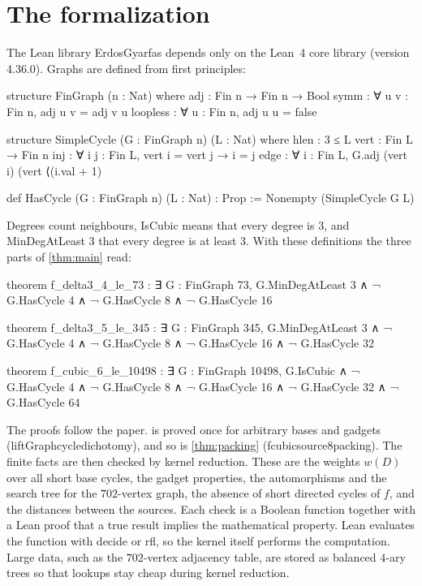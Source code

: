 \documentclass[11pt]{amsart}
\theoremstyle{definition}
\theoremstyle{remark}
\newcommand{\leanus}{\textunderscore\allowbreak}
\newcommand{\lean}[1]{{\ttfamily\let\_\leanus #1}}
\begin{document}
\section{The formalization}\label{sec:formal}

The Lean library \lean{ErdosGyarfas} depends only on the Lean~4 core library
(version 4.36.0). Graphs are defined from first principles:

\begin{leancode}
structure FinGraph (n : Nat) where
  adj : Fin n → Fin n → Bool
  symm : ∀ u v : Fin n, adj u v = adj v u
  loopless : ∀ u : Fin n, adj u u = false

structure SimpleCycle (G : FinGraph n) (L : Nat) where
  hlen : 3 ≤ L
  vert : Fin L → Fin n
  inj : ∀ i j : Fin L, vert i = vert j → i = j
  edge : ∀ i : Fin L,
    G.adj (vert i) (vert ⟨(i.val + 1) %

def HasCycle (G : FinGraph n) (L : Nat) : Prop := Nonempty (SimpleCycle G L)
\end{leancode}

Degrees count neighbours, \lean{IsCubic} means that every degree is $3$, and
\lean{MinDegAtLeast 3} that every degree is at least $3$. With these
definitions the three parts of \cref{thm:main} read:

\begin{leancode}
theorem f_delta3_4_le_73 : ∃ G : FinGraph 73,
    G.MinDegAtLeast 3 ∧ ¬ G.HasCycle 4 ∧ ¬ G.HasCycle 8 ∧ ¬ G.HasCycle 16
\end{leancode}
\begin{leancode}
theorem f_delta3_5_le_345 : ∃ G : FinGraph 345,
    G.MinDegAtLeast 3 ∧ ¬ G.HasCycle 4 ∧ ¬ G.HasCycle 8 ∧
    ¬ G.HasCycle 16 ∧ ¬ G.HasCycle 32
\end{leancode}
\begin{leancode}
theorem f_cubic_6_le_10498 : ∃ G : FinGraph 10498,
    G.IsCubic ∧ ¬ G.HasCycle 4 ∧ ¬ G.HasCycle 8 ∧
    ¬ G.HasCycle 16 ∧ ¬ G.HasCycle 32 ∧ ¬ G.HasCycle 64
\end{leancode}

The proofs follow the paper.  is proved once for arbitrary
bases and gadgets (\lean{liftGraph\_cycle\_dichotomy}), and so is
\cref{thm:packing} (\lean{f\_cubic\_6\_source\_8packing}). The finite facts are
then checked by kernel reduction. These are the weights $w(D)$ over all short
base cycles, the gadget properties, the automorphisms and the search tree for
the $702$-vertex graph, the absence of short directed cycles of $f$, and the
distances between the sources. Each check is a Boolean function together with
a Lean proof that a \lean{true} result implies the mathematical property. Lean
evaluates the function with \lean{decide} or \lean{rfl}, so the kernel itself
performs the computation. Large data, such as the $702$-vertex adjacency table,
are stored as balanced $4$-ary trees so that lookups stay cheap during kernel
reduction.
\end{document}
